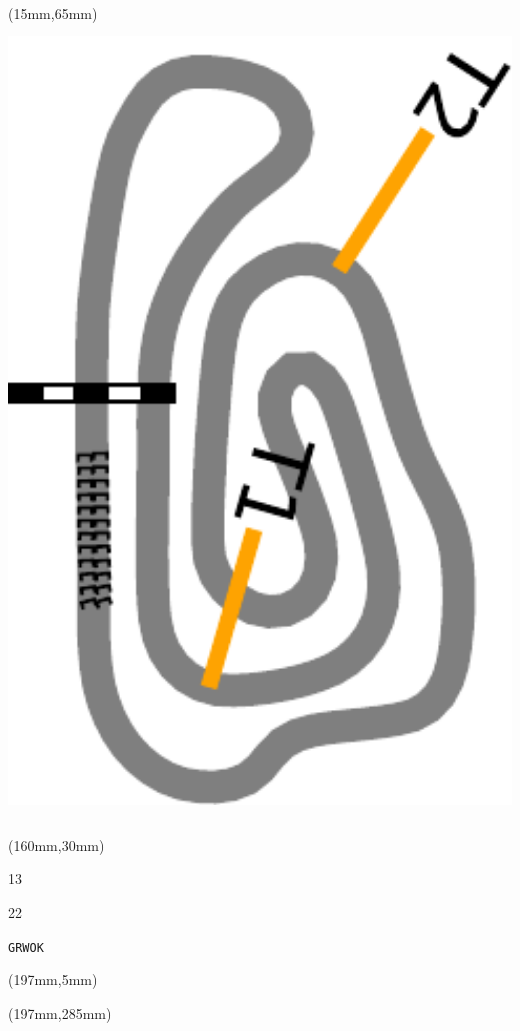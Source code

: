 \begin{textblock*}{185mm}(15mm,65mm)%
\centering
\mbox{\includegraphics[width=185mm,height=210mm,keepaspectratio]{PT/GRWOK.pdf}}
\end{textblock*}
\begin{textblock*}{40mm}(160mm,30mm)%
\Large
\par{} 
\par13 
\par22 
\par\hfill\tiny\tt GRWOK\\
\end{textblock*}
\begin{textblock*}{20mm}(197mm,5mm)%
\fbox{\thepage}
\label{GRWOK}
\end{textblock*}
\begin{textblock*}{20mm}(197mm,285mm)%
\fbox{\thepage}
\end{textblock*}

